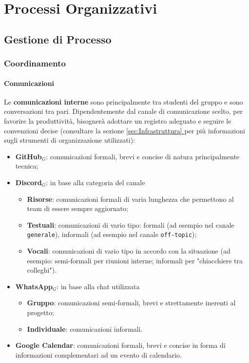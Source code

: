 \chapter{Processi Organizzativi}

\section{Gestione di Processo}

\subsection{Coordinamento}

\subsubsection{Comunicazioni}
Le \textbf{comunicazioni interne} sono principalmente tra studenti del gruppo e sono conversazioni tra pari. Dipendentemente dal canale di comunicazione scelto, per favorire la produttività, bisognerà adottare un registro adeguato e seguire le convenzioni decise (consultare la sezione \underline{\ref{sec:Infrastruttura} } per più informazioni sugli strumenti di organizzazione utilizzati):
\begin{itemize}
  \item \textbf{GitHub}$_G$: comunicazioni formali, brevi e concise di natura principalmente tecnica;
  \item \textbf{Discord}$_G$: in base alla categoria del canale
  \begin{itemize}
    \item \textbf{Risorse}: comunicazioni formali di varia lunghezza che permettono al team di essere sempre aggiornato;
    \item \textbf{Testuali}: comunicazioni di vario tipo: formali (ad esempio nel canale \texttt{generale}), informali (ad esempio nel canale \texttt{off-topic});
    \item \textbf{Vocali}: comunicazioni di vario tipo in accordo con la situazione (ad esempio: semi-formali per riunioni interne; informali per "chiacchiere tra colleghi").
  \end{itemize}
  \item \textbf{WhatsApp}$_G$: in base alla chat utilizzata
  \begin{itemize}
    \item \textbf{Gruppo}: comunicazioni semi-formali, brevi e strettamente inerenti al progetto;
    \item \textbf{Individuale}: comunicazioni informali.
  \end{itemize}
  \item \textbf{Google Calendar}: comunicazioni formali, brevi e concise in forma di informazioni complementari ad un evento di calendario.
\end{itemize}

